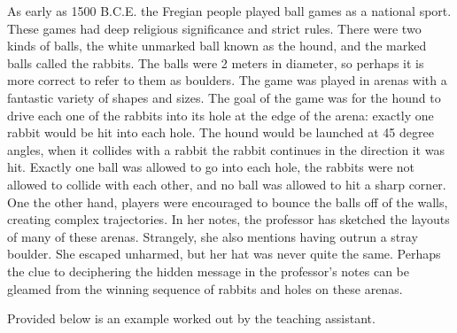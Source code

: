 As early as 1500 B.C.E. the Fregian people played ball games as a national sport.
These games had deep religious significance and strict rules.
There were two kinds of balls, the white unmarked ball known as the hound, and the marked balls called the rabbits.
The balls were 2 meters in diameter, so perhaps it is more correct to refer to them as boulders.
The game was played in arenas with a fantastic variety of shapes and sizes.
The goal of the game was for the hound to drive each one of the rabbits into its hole at the edge of the arena: exactly one rabbit would be hit into each hole.
The hound would be launched at 45 degree angles, when it collides with a rabbit the rabbit continues in the direction it was hit.
Exactly one ball was allowed to go into each hole, the rabbits were not allowed to collide with each other, and no ball was allowed to hit a sharp corner.
One the other hand, players were encouraged to bounce the balls off of the walls, creating complex trajectories.
In her notes, the professor has sketched the layouts of many of these arenas.
Strangely, she also mentions having outrun a stray boulder.
She escaped unharmed, but her hat was never quite the same.
Perhaps the clue to deciphering the hidden message in the professor's notes can be gleamed from the winning sequence of rabbits and holes on these arenas.

Provided below is an example worked out by the teaching assistant.